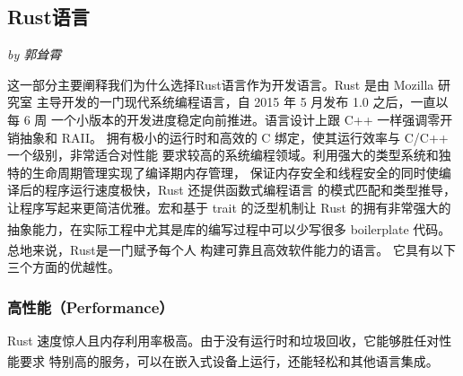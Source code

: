 \documentclass[UTF8,fontset=none,linespread=1.15]{ctexart}
\let\nosupcite\cite
\renewcommand*{\cite}[1]{\textsuperscript{\nosupcite{#1}}}
\newcommand{\sectionauthor}[1]{%
\vspace*{-5ex}
\noindent\textrm{\hfill\textit{by #1}}
\vspace*{3ex}\par}
\begin{document}
\subsection{Rust语言}\sectionauthor{郭耸霄}

这一部分主要阐释我们为什么选择Rust语言作为开发语言。Rust 是由 Mozilla 研究室
主导开发的一门现代系统编程语言，自 2015 年 5 月发布 1.0 之后，一直以每 6 周
一个小版本的开发进度稳定向前推进。语言设计上跟 C++ 一样强调零开销抽象和 RAII。
拥有极小的运行时和高效的 C 绑定，使其运行效率与 C/C++ 一个级别，非常适合对性能
要求较高的系统编程领域。利用强大的类型系统和独特的生命周期管理实现了编译期内存管理，
保证内存安全和线程安全的同时使编译后的程序运行速度极快，Rust 还提供函数式编程语言
的模式匹配和类型推导，让程序写起来更简洁优雅。宏和基于 trait 的泛型机制让 Rust
的拥有非常强大的抽象能力，在实际工程中尤其是库的编写过程中可以少写很多 boilerplate
代码。\cite{bib:2-why-rust}
总地来说，Rust是一门赋予每个人 构建可靠且高效软件能力的语言。\cite{bib:1-rust-lang}
它具有以下三个方面的优越性。

\subsubsection{高性能（Performance）}

Rust 速度惊人且内存利用率极高。由于没有运行时和垃圾回收，它能够胜任对性能要求
特别高的服务，可以在嵌入式设备上运行，还能轻松和其他语言集成。\cite{bib:1-rust-lang}
\end{document}

